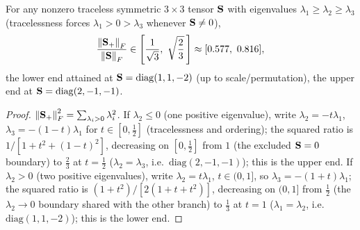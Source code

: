 \begin{corollary}
\label{cor:shear-regularisation-bound}
For any nonzero traceless symmetric $3\times3$ tensor $\mathbf{S}$ with
eigenvalues $\lambda_1\geq\lambda_2\geq\lambda_3$ (tracelessness forces
$\lambda_1>0>\lambda_3$ whenever $\mathbf{S}\neq0$),
\begin{equation}
  \frac{\norm{\Splus}_F}{\norm{\Shear}_F} \in
  \left[\frac{1}{\sqrt3},\ \sqrt{\frac23}\,\right] \approx [0.577,\ 0.816] ,
\end{equation}
the lower end attained at $\mathbf{S}=\mathrm{diag}(1,1,-2)$ (up to scale/permutation),
the upper end at $\mathbf{S}=\mathrm{diag}(2,-1,-1)$.
\end{corollary}
\begin{proof}
$\norm{\mathbf{S}_{+}}_F^2=\sum_{\lambda_i>0}\lambda_i^2$. If $\lambda_2\leq0$
(one positive eigenvalue), write $\lambda_2=-t\lambda_1$,
$\lambda_3=-(1-t)\lambda_1$ for $t\in[0,\tfrac12]$ (tracelessness and
ordering); the squared ratio is
$1/[1+t^2+(1-t)^2]$, decreasing on $[0,\tfrac12]$ from $1$ (the excluded
$\mathbf{S}=0$ boundary) to $\tfrac23$ at $t=\tfrac12$
($\lambda_2=\lambda_3$, i.e.\ $\mathrm{diag}(2,-1,-1)$); this is the upper end.
If $\lambda_2>0$ (two positive eigenvalues), write $\lambda_2=t\lambda_1$,
$t\in(0,1]$, so $\lambda_3=-(1+t)\lambda_1$; the squared ratio is
$(1+t^2)/[2(1+t+t^2)]$, decreasing on $(0,1]$ from $\tfrac12$ (the
$\lambda_2\to0$ boundary shared with the other branch) to $\tfrac13$ at
$t=1$ ($\lambda_1=\lambda_2$, i.e.\ $\mathrm{diag}(1,1,-2)$); this is the lower
end.
\end{proof}

